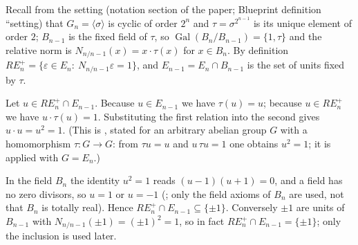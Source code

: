 Recall from the setting (notation section of the paper; Blueprint definition ``setting) that $G_n=\langle\sigma\rangle$ is cyclic of order $2^n$ and $\tau=\sigma^{2^{n-1}}$ is its unique element of order $2$; $B_{n-1}$ is the fixed field of $\tau$, so $\operatorname{Gal}(B_n/B_{n-1})=\{1,\tau\}$ and the relative norm is $N_{n/n-1}(x)=x\cdot\tau(x)$ for $x\in B_n$. By definition $RE^+_n=\{\varepsilon\in E_n:\ N_{n/n-1}\varepsilon=1\}$, and $E_{n-1}=E_n\cap B_{n-1}$ is the set of units fixed by $\tau$.

Let $u\in RE^+_n\cap E_{n-1}$. Because $u\in E_{n-1}$ we have $\tau(u)=u$; because $u\in RE^+_n$ we have $u\cdot\tau(u)=1$. Substituting the first relation into the second gives $u\cdot u=u^2=1$. (This is , stated for an arbitrary abelian group $G$ with a homomorphism $\tau:G\to G$: from $\tau u=u$ and $u\,\tau u=1$ one obtains $u^2=1$; it is applied with $G=E_n$.)

In the field $B_n$ the identity $u^2=1$ reads $(u-1)(u+1)=0$, and a field has no zero divisors, so $u=1$ or $u=-1$ (; only the field axioms of $B_n$ are used, not that $B_n$ is totally real). Hence $RE^+_n\cap E_{n-1}\subseteq\{\pm1\}$. Conversely $\pm1$ are units of $B_{n-1}$ with $N_{n/n-1}(\pm1)=(\pm1)^2=1$, so in fact $RE^+_n\cap E_{n-1}=\{\pm1\}$; only the inclusion is used later.
